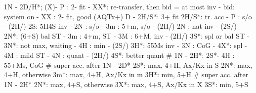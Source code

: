 1N - 2D/H*;
(X)- P  : 2- fit
        - XX*: re-transfer, then bid = at most inv
        - bid: system on
   - XX : 2- fit, good (AQTx+) D
   - 2H/S*: 3+ fit
2H/S*: tr. acc
     - P  : s/o
     - (2H/) 2S: 5H4S inv
          - 2N : s/o
              - 3m : 5+m, s/o
     - (2H/) 2N : nat inv
     - (2S/) 2N*: (6+S) bal ST
     - 3m : 4+m, ST
     - 3M : 6+M, inv
     - (2H/) 3S*: spl or bal ST
                - 3N*: not max, waiting
                - 4H : min
     - (2S/) 3H*: 55Ms inv
     - 3N : CoG
     - 4X*: spl
     - 4M : mild ST
     - 4N : quant
     - (2H/) 4S*: better quant
# 1N - 2H*; 2S*- 4H : 55+Ms, CoG
# super acc. after 1N - 2D*
2S*: max, 4+H, Ax/Kx in S
2N*: max, 4+H, otherwise
3m*: max, 4+H, Ax/Kx in m
3H*: min, 5+H
# super acc. after 1N - 2H*
2N*: max, 4+S, otherwise
3X*: max, 4+S, Ax/Kx in X
3S*: min, 5+S


